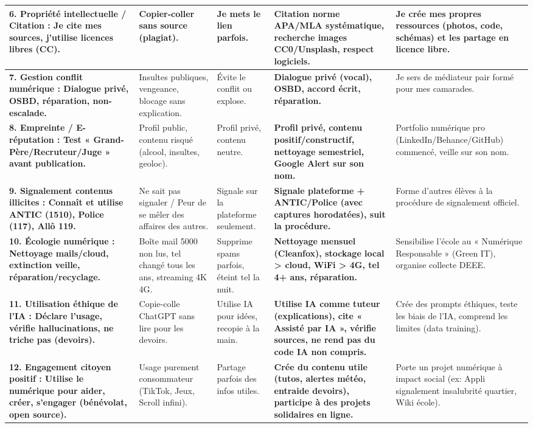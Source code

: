 \documentclass[11pt]{article}
\begin{document}
\begin{methode}
\begin{enumerate}
\begin{center}
\begin{tabularx}{\linewidth}{|>{\bfseries}l|X|X|X|X|}
    \hline
    6. \textbf{Propriété intellectuelle / Citation} : Je cite mes sources, j'utilise licences libres (CC). & Copier-coller sans source (plagiat). & Je mets le lien parfois. & \textbf{Citation norme APA/MLA systématique, recherche images CC0/Unsplash, respect logiciels.} & Je crée mes propres ressources (photos, code, schémas) et les partage en licence libre. \\
    \hline
    7. \textbf{Gestion conflit numérique} : Dialogue privé, OSBD, réparation, non-escalade. & Insultes publiques, vengeance, blocage sans explication. & Évite le conflit ou explose. & \textbf{Dialogue privé (vocal), OSBD, accord écrit, réparation.} & Je sers de médiateur pair formé pour mes camarades. \\
    \hline
    8. \textbf{Empreinte / E-réputation} : Test « Grand-Père/Recruteur/Juge » avant publication. & Profil public, contenu risqué (alcool, insultes, geoloc). & Profil privé, contenu neutre. & \textbf{Profil privé, contenu positif/constructif, nettoyage semestriel, Google Alert sur son nom.} & Portfolio numérique pro (LinkedIn/Behance/GitHub) commencé, veille sur son nom. \\
    \hline
    9. \textbf{Signalement contenus illicites} : Connaît et utilise ANTIC (1510), Police (117), Allô 119. & Ne sait pas signaler / Peur de se mêler des affaires des autres. & Signale sur la plateforme seulement. & \textbf{Signale plateforme + ANTIC/Police (avec captures horodatées), suit la procédure.} & Forme d'autres élèves à la procédure de signalement officiel. \\
    \hline
    10. \textbf{Écologie numérique} : Nettoyage mails/cloud, extinction veille, réparation/recyclage. & Boîte mail 5000 non lus, tel changé tous les ans, streaming 4K 4G. & Supprime spams parfois, éteint tel la nuit. & \textbf{Nettoyage mensuel (Cleanfox), stockage local > cloud, WiFi > 4G, tel 4+ ans, réparation.} & Sensibilise l'école au « Numérique Responsable » (Green IT), organise collecte DEEE. \\
    \hline
    11. \textbf{Utilisation éthique de l'IA} : Déclare l'usage, vérifie hallucinations, ne triche pas (devoirs). & Copie-colle ChatGPT sans lire pour les devoirs. & Utilise IA pour idées, recopie à la main. & \textbf{Utilise IA comme tuteur (explications), cite « Assisté par IA », vérifie sources, ne rend pas du code IA non compris.} & Crée des prompts éthiques, teste les biais de l'IA, comprend les limites (data training). \\
    \hline
    12. \textbf{Engagement citoyen positif} : Utilise le numérique pour aider, créer, s'engager (bénévolat, open source). & Usage purement consommateur (TikTok, Jeux, Scroll infini). & Partage parfois des infos utiles. & \textbf{Crée du contenu utile (tutos, alertes météo, entraide devoirs), participe à des projets solidaires en ligne.} & Porte un projet numérique à impact social (ex: Appli signalement insalubrité quartier, Wiki école). \\

\end{tabularx}
\end{center}
\end{enumerate}
\end{methode}
\end{document}
